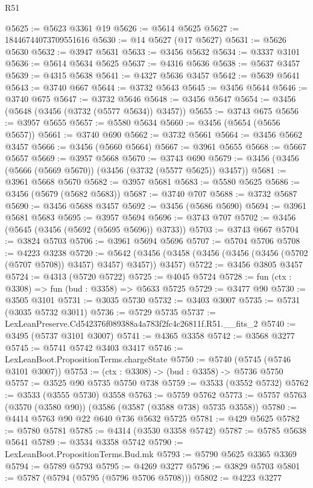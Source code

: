 \begin{lexlean}{R51}
\begin{coremodule}
@5625 := @5623 @3361 @19
@5626 := @5614 @5625
@5627 := 18446744073709551616
@5630 := @14 @5627 (@17 @5627)
@5631 := @5626 @5630
@5632 := @3947 @5631
@5633 := @3456 @5632
@5634 := @3337 @3101
@5636 := @5614 @5634 @5625
@5637 := @4316 @5636
@5638 := @5637 @3457
@5639 := @4315 @5638
@5641 := @4327 @5636 @3457
@5642 := @5639 @5641
@5643 := @3740 @667
@5644 := @3732 @5643
@5645 := @3456 @5644
@5646 := @3740 @675
@5647 := @3732 @5646
@5648 := @3456 @5647
@5654 := @3456 (@5648 (@3456 (@3732 (@5577 @5634)) @3457))
@5655 := @3743 @675
@5656 := @3957 @5655
@5657 := @5580 @5634
@5660 := @3456 (@5654 (@5656 @5657))
@5661 := @3740 @690
@5662 := @3732 @5661
@5664 := @3456 @5662 @3457
@5666 := @3456 (@5660 @5664)
@5667 := @3961 @5655
@5668 := @5667 @5657
@5669 := @3957 @5668
@5670 := @3743 @690
@5679 := @3456 (@3456 (@5666 (@5669 @5670)) (@3456 (@3732 (@5577 @5625)) @3457))
@5681 := @3961 @5668 @5670
@5682 := @3957 @5681
@5683 := @5580 @5625
@5686 := @3456 (@5679 (@5682 @5683))
@5687 := @3740 @707
@5688 := @3732 @5687
@5690 := @3456 @5688 @3457
@5692 := @3456 (@5686 @5690)
@5694 := @3961 @5681 @5683
@5695 := @3957 @5694
@5696 := @3743 @707
@5702 := @3456 (@5645 (@3456 (@5692 (@5695 @5696)) @3733))
@5703 := @3743 @667
@5704 := @3824 @5703
@5706 := @3961 @5694 @5696
@5707 := @5704 @5706
@5708 := @4223 @3238
@5720 := @5642 (@3456 (@3458 (@3456 (@3456 (@3456 (@5702 (@5707 @5708)) @3457) @3457) @3457)) @3457)
@5722 := @3456 @3805 @3457
@5724 := @4313 (@5720 @5722)
@5725 := @4045 @5724
@5728 := fun (ctx : @3308) => fun (bud : @3358) => @5633 @5725
@5729 := @3477 @90
@5730 := @3505 @3101
@5731 := @3035 @5730
@5732 := @3403 @3007
@5735 := @5731 (@3035 @5732 @3011)
@5736 := @5729 @5735
@5737 := LexLeanPreserve.Cd542376f089388a4a783f2fc4c26811f.R51.__fits_2
@5740 := @3495 (@5737 @3101 @3007)
@5741 := @4365 @3358
@5742 := @3568 @3277
@5745 := @5741 @5742 @3403 @3417
@5746 := LexLeanBoot.PropositionTerms.chargeState
@5750 := @5740 (@5745 (@5746 @3101 @3007))
@5753 := (ctx : @3308) -> (bud : @3358) -> @5736 @5750
@5757 := @3525 @90 @5735 @5750 @738
@5759 := @3533 (@3552 @5732)
@5762 := @3533 (@3555 @5730) @3558
@5763 := @5759 @5762
@5773 := @5757 @5763 (@3570 (@3580 @90)) (@3586 (@3587 (@3588 @738) @5735 @3558))
@5780 := @4414 @5763 @90 @22 @640 @736 @5632 @5725
@5781 := @429 @5625
@5782 := @5780 @5781
@5785 := @4314 (@3530 @3358 @5742)
@5787 := @5785 @5638 @5641
@5789 := @3534 @3358 @5742
@5790 := LexLeanBoot.PropositionTerms.Bud.mk
@5793 := @5790 @5625 @3365 @3369
@5794 := @5789 @5793
@5795 := @4269 @3277
@5796 := @3829 @5703
@5801 := @5787 (@5794 (@5795 (@5796 @5706 @5708)))
@5802 := @4223 @3277

\end{coremodule}
\end{lexlean}

